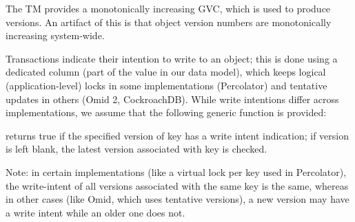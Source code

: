 The TM provides a monotonically increasing GVC, which is used to produce
versions. An artifact of this is that object version numbers are monotonically
increasing system-wide.

Transactions indicate their intention to write to an object; this is done using
a dedicated column (part of the value in our data model), which keeps logical
(application-level) locks in some implementations (Percolator) and tentative
updates in others (Omid 2, CockroachDB). 
While write intentions differ across implementations,
we assume that the following generic function is  provided:

 returns true if the specified version of key has a write intent indication; if version is left blank, the 
latest version associated with key is checked.

Note: in certain implementations (like a virtual lock per key used in
Percolator), the write-intent of all versions associated with the same key is
the same, whereas in other cases (like Omid, which uses tentative versions), a
new version may have a write intent while an older one does not.

